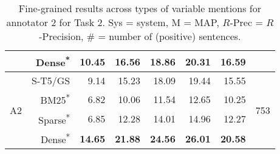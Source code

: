 \documentclass[11pt]{article}
\begin{document}
\begin{table*}[]
\begin{tabular}{l|r|r|r|r|r|r|c}
      &    Dense\textsuperscript{*} &  \textbf{10.45} &  \textbf{16.56} &   \textbf{18.86} &   \textbf{20.31} &        \textbf{16.59} &         \\
    \hline
    \hline
       \multirow{4}{2em}{A2} &    S-T5/GS &   9.14 &  15.23 &   18.09 &   19.44 &        15.55 &      \multirow{4}{2em}{753} \\
        &    BM25\textsuperscript{*} &   6.82 &  10.06 &   11.54 &   12.65 &        10.25 &       \\
        &    Sparse\textsuperscript{*} &   6.85 &  12.28 &   14.01 &   14.96 &        12.27 &       \\
        &    Dense\textsuperscript{*} &  \textbf{14.65} &  \textbf{21.88} &   \textbf{24.56} &   \textbf{26.01} &        \textbf{20.58} &       \\
    \hline
    \end{tabular}
    \caption{Fine-grained results across types of variable mentions for annotator 2 for Task 2. Sys = system, M = MAP, $R$-Prec = $R$-Precision, \# = number of (positive) sentences.}
    \label{tab:T2-Ann2}
\end{table*}
\end{document}
